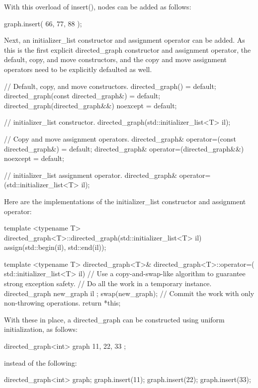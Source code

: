 With this overload of insert(), nodes can be added as follows:

\begin{cpp}
graph.insert({ 66, 77, 88 });
\end{cpp}

Next, an initializer\_list constructor and assignment operator can be added. As this is the first explicit directed\_graph constructor and assignment operator, the default, copy, and move constructors, and the copy and move assignment operators need to be explicitly defaulted as well.

\begin{cpp}
// Default, copy, and move constructors.
directed_graph() = default;
directed_graph(const directed_graph&) = default;
directed_graph(directed_graph&&) noexcept = default;

// initializer_list constructor.
directed_graph(std::initializer_list<T> il);

// Copy and move assignment operators.
directed_graph& operator=(const directed_graph&) = default;
directed_graph& operator=(directed_graph&&) noexcept = default;

// initializer_list assignment operator.
directed_graph& operator=(std::initializer_list<T> il);
\end{cpp}

Here are the implementations of the initializer\_list constructor and assignment operator:

\begin{cpp}
template <typename T>
directed_graph<T>::directed_graph(std::initializer_list<T> il)
{
    assign(std::begin(il), std::end(il));
}

template <typename T>
directed_graph<T>& directed_graph<T>::operator=(
    std::initializer_list<T> il)
{
    // Use a copy-and-swap-like algorithm to guarantee strong exception safety.
    // Do all the work in a temporary instance.
    directed_graph new_graph { il };
    swap(new_graph); // Commit the work with only non-throwing operations.
    return *this;
}
\end{cpp}

With these in place, a directed\_graph can be constructed using uniform initialization, as follows:

\begin{cpp}
directed_graph<int> graph { 11, 22, 33 };
\end{cpp}

instead of the following:

\begin{cpp}
directed_graph<int> graph;
graph.insert(11);
graph.insert(22);
graph.insert(33);
\end{cpp}

